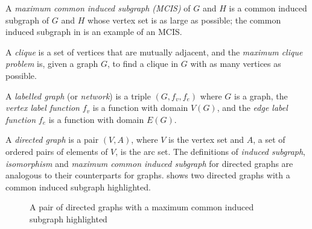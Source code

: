 A \emph{maximum common induced subgraph (MCIS)} of $G$ and $H$ is a common
induced subgraph of $G$ and $H$ whose vertex set is as large as possible; the
common induced subgraph in  is an example of an MCIS.

A \emph{clique} is a set of vertices that are mutually adjacent, and the
\emph{maximum clique problem} is, given a graph $G$, to find a clique in $G$
with as many vertices as possible.

A \emph{labelled graph} (or \emph{network}) is a triple $(G, f_v, f_e)$
where $G$ is a graph,
the \emph{vertex label function} $f_v$ is a function with domain $V(G)$,
and the \emph{edge label function} $f_e$ is a function with domain $E(G)$.

A \emph{directed graph} is a pair $(V,A)$, where $V$ is the vertex set and $A$,
a set of ordered pairs of elements of $V$, is the arc set.  The definitions of
\emph{induced subgraph}, \emph{isomorphism} and \emph{maximum common induced
subgraph} for directed graphs are analogous to their counterparts for graphs.
 shows two directed graphs with a common
induced subgraph highlighted.

\begin{figure}[h!]
\centering
{}
\qquad
{}
\caption{A pair of directed graphs with a maximum common induced subgraph highlighted}
\label{fig:directed-cis-example}
\end{figure}

